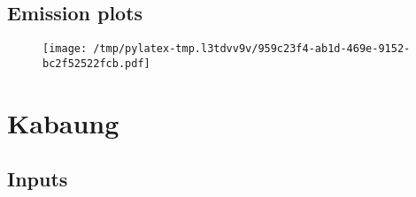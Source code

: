 \documentclass{article}%
\begin{document}
\subsection{Emission plots}%
\label{subsec:Emissionplots}%


\begin{figure}[htbp]%
\centering%
\texttt{[image: /tmp/pylatex-tmp.l3tdvv9v/959c23f4-ab1d-469e-9152-bc2f52522fcb.pdf]}%
\end{figure}

%
\section{Kabaung}%
\label{sec:Kabaung}%
\subsection{Inputs}%
\label{subsec:Inputs}%
\end{document}
